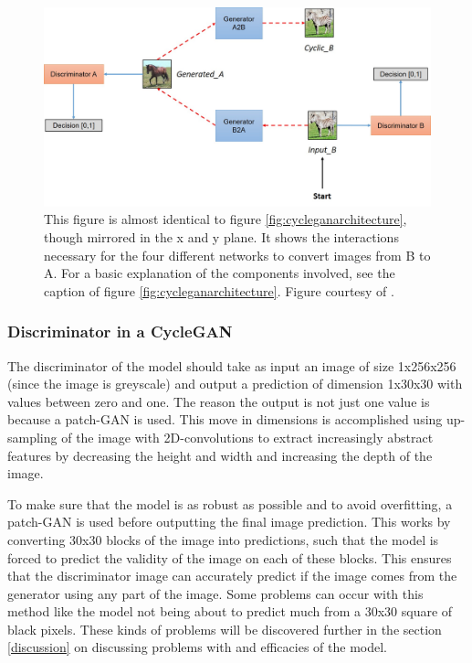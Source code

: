 \documentclass[12pt, fleqn, titlepage]{article}
\begin{document}
\begin{figure}[H]
	\centering
	\includegraphics[width=0.7\linewidth]{imgs/cyclegan_architecture2}
	\caption{This figure is almost identical to figure \ref{fig:cycleganarchitecture}, though mirrored in the x and y plane. It shows the interactions necessary for the four different networks to convert images from B to A. For a basic explanation of the components involved, see the caption of figure \ref{fig:cycleganarchitecture}. Figure courtesy of \cite{model_architecture}.}
	\label{fig:cycleganarchitecture2}
\end{figure}


\subsubsection{Discriminator in a CycleGAN}
The discriminator of the model should take as input an image of size 1x256x256 (since the image is greyscale) and output a prediction of dimension 1x30x30 with values between zero and one. The reason the output is not just one value is because a patch-GAN is used. This move in dimensions is accomplished using up-sampling of the image with 2D-convolutions to extract increasingly abstract features by decreasing the height and width and increasing the depth of the image.

To make sure that the model is as robust as possible and to avoid overfitting, a patch-GAN is used before outputting the final image prediction. This works by converting 30x30 blocks of the image into predictions, such that the model is forced to predict the validity of the image on each of these blocks. This ensures that the discriminator image can accurately predict if the image comes from the generator using any part of the image. Some problems can occur with this method like the model not being about to predict much from a 30x30 square of black pixels. These kinds of problems will be discovered further in the section \ref{discussion} on discussing problems with and efficacies of the model.
\end{document}
